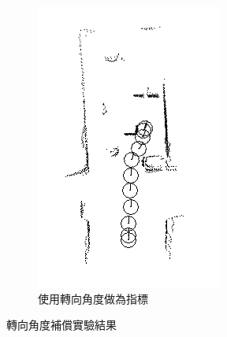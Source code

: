 \begin{figure}[h!]
\begin{subfigure}[t]{0.48\textwidth}
		\label{f:exp:CAComp}
	\end{subfigure}
	\begin{subfigure}[t]{0.48\textwidth}
		\includegraphics[width=\textwidth]{figures/experiments/path_NoCAComp}
		\caption{使用轉向角度做為指標}
		\label{f:exp:NoCAComp}
	\end{subfigure}
	\caption{轉向角度補償實驗結果}
\end{figure}

